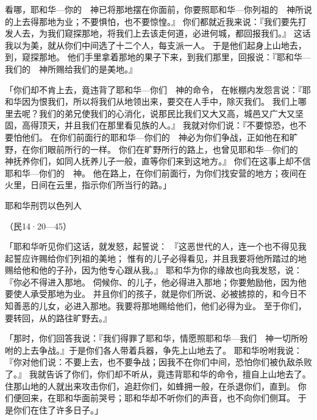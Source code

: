 {看哪，耶和华—你的　神已将那地摆在你面前，你要照耶和华—你列祖的　神所说的上去得那地为业；不要惧怕，也不要惊惶。』
你们都就近我来说：『我们要先打发人去，为我们窥探那地，将我们上去该走何道，必进何城，都回报我们。』
这话我以为美，就从你们中间选了十二个人，每支派一人。
于是他们起身上山地去，到{}，窥探那地。
他们手里拿着那地的果子下来，到我们那里，回报说：『耶和华—我们的　神所赐给我们的是美地。』
\par }{\PP {}「你们却不肯上去，竟违背了耶和华—你们　神的命令，
在帐棚内发怨言说：『耶和华因为恨我们，所以将我们从{}地领出来，要交在{}人手中，除灭我们。
我们上哪里去呢？我们的弟兄使我们的心消化，说那{}民比我们又大又高，城邑又广大又坚固，高得顶天，并且我们在那里看见{}族的人。』
我就对你们说：『不要惊恐，也不要怕他们。
在你们前面行的耶和华—你们的　神必为你们争战，正如他在{}和旷野，在你们眼前所行的一样。
你们在旷野所行的路上，也曾见耶和华—你们的　神抚养你们，如同人抚养儿子一般，直等你们来到这地方。』
你们在这事上却不信耶和华—你们的　神。
他在路上，在你们前面行，为你们找安营的地方；夜间在火{}里，日间在云{}里，指示你们所当行的路。」
\par }{\SH 耶和华刑罚以色列人
\par }{\R （民14·20—45）
\par }{\PP {}「耶和华听见你们这话，就发怒，起誓说：
『这恶世代的人，连一个也不得见我起誓应许赐给你们列祖的美地；
惟有{}的儿子{}必得看见，并且我要将他所踏过的地赐给他和他的子孙，因为他专心跟从我。』
耶和华为你的缘故也向我发怒，说：『你必不得进入那地。
伺候你、{}的儿子{}，他必得进入那地；你要勉励他，因为他要使{}人承受那地为业。
并且你们的{}孩子，就是你们所说、必被掳掠的，和今日不知善恶的儿女，必进入那地。我要将那地赐给他们，他们必得为业。
至于你们，要转回，从{}的路往旷野去。』
\par }{\PP {}「那时，你们回答我说：『我们得罪了耶和华，情愿照耶和华—我们　神一切所吩咐的上去争战。』于是你们各人带着兵器，争先上山地去了。
耶和华吩咐我说：『你对他们说：不要上去，也不要争战；因我不在你们中间，恐怕你们被仇敌杀败了。』
我就告诉了你们，你们却不听从，竟违背耶和华的命令，擅自上山地去了。
住那山地的{}人就出来攻击你们，追赶你们，如蜂拥一般，在{}杀退你们，直到{}。
你们便回来，在耶和华面前哭号；耶和华却不听你们的声音，也不向你们侧耳。
于是你们在{}住了许多日子。」

}
